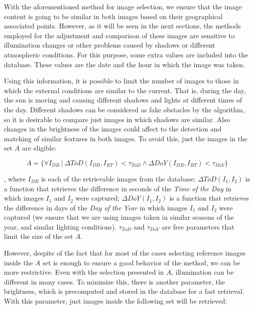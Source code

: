 With the aforementioned method for image selection, we ensure that the image content is going to be similar in both images based on their geographical associated points. However, as it will be seen in the next sections, the methods employed for the adjustment and comparison of these images are sensitive to illumination changes or other problems caused by shadows or different atmospheric conditions. For this purpose, some extra values are included into the database. These values are the date and the hour in which the image was taken.

Using this information, it is possible to limit the number of images to those in which the external conditions are similar to the current. That is, during the day, the sun is moving and causing different shadows and lights at different times of the day. Different shadows can be considered as fake obstacles by the algorithm, so it is desirable to compare just images in which shadows are similar. Also changes in the brightness of the images could affect to the detection and matching of similar features in both images. To avoid this, just the images in the set $A$ are eligible:

\begin{equation}\label{eq:cp01_eligible_images_by_time}
A = \{ \forall I_{DB} ~|~ \Delta ToD(I_{DB}, I_{RT}) < \tau_{ToD} \wedge \Delta DoY(I_{DB}, I_{RT}) < \tau_{DoY} \}
\end{equation}

, where $I_{DB}$ is each of the retrievable images from the database; $\Delta ToD(I_1, I_2)$ is a function that retrieves the difference in seconds of the \emph{Time of the Day} in which images $I_1$ and $I_2$ were captured; $\Delta DoY(I_1, I_2)$ is a function that retrieves the difference in days of the \emph{Day of the Year} in which images $I_1$ and $I_2$ were captured (we ensure that we are using images taken in similar seasons of the year, and similar lighting conditions). $\tau_{ToD}$ and $\tau_{DoY}$ are free parameters that limit the size of the set $A$.

However, despite of the fact that for most of the cases selecting reference images inside the $A$ set is enough to ensure a good behavior of the method, we can be more restrictive. Even with the selection presented in $A$, illumination can be different in many cases. To minimize this, there is another parameter, the brightness, which is precomputed and stored in the database for a fast retrieval. With this parameter, just images inside the following set will be retrieved:

